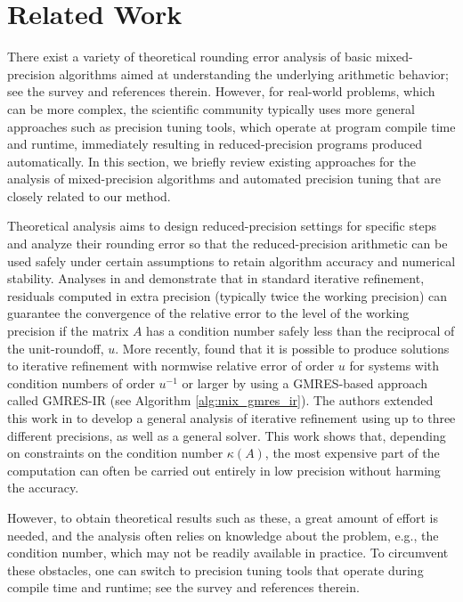 \documentclass[Afour,sageh,times]{sagej}
\theoremstyle{plain}
\theoremstyle{definition}
\begin{document}
\section{Related Work}\label{sec:related_work}
There exist a variety of theoretical rounding error analysis of basic mixed-precision algorithms aimed at understanding the underlying arithmetic behavior;  see the survey \cite{doi:10.1177/10943420211003313} and references therein. However, for real-world problems, which can be more complex, the scientific community typically uses more general approaches such as precision tuning tools, which operate at program compile time and runtime, immediately resulting in reduced-precision programs produced automatically.  In this section, we briefly review existing approaches for the analysis of mixed-precision algorithms and automated precision tuning that are closely related to our method.

Theoretical analysis aims to design reduced-precision settings for specific steps and analyze their rounding error so that the reduced-precision arithmetic can be used safely under certain assumptions to retain algorithm accuracy and numerical stability. Analyses in \cite{WILKINSON1966} and \cite{10.1145/321386.321394} demonstrate that in standard iterative refinement, residuals computed in extra precision (typically twice the working precision) can guarantee the convergence of the relative error to the level of the working precision if the matrix $A$ has a condition number safely less than the reciprocal of the unit-roundoff, $u$. More recently, \cite{doi:10.1137/17M1122918} found that it is possible to produce solutions to iterative refinement with normwise relative error of order $u$ for systems with condition numbers of order $u^{-1}$ or larger by using a GMRES-based approach called GMRES-IR (see Algorithm \ref{alg:mix_gmres_ir}). The authors extended this work in \cite{doi:10.1137/17M1140819} to develop a general analysis of iterative refinement using up to three different precisions, as well as a general solver. This work shows that, depending on constraints on the condition number $\kappa(A)$, the most expensive part of the computation can often be carried out entirely in low precision without harming the accuracy.

However, to obtain theoretical results such as these, a great amount of effort is needed, and the analysis often relies on knowledge about the problem, e.g., the condition number, which may not be readily available in practice.  To circumvent these obstacles, one can switch to precision tuning tools that operate during compile time and runtime; see the survey \cite{10.1145/3381039} and references therein.
\end{document}
